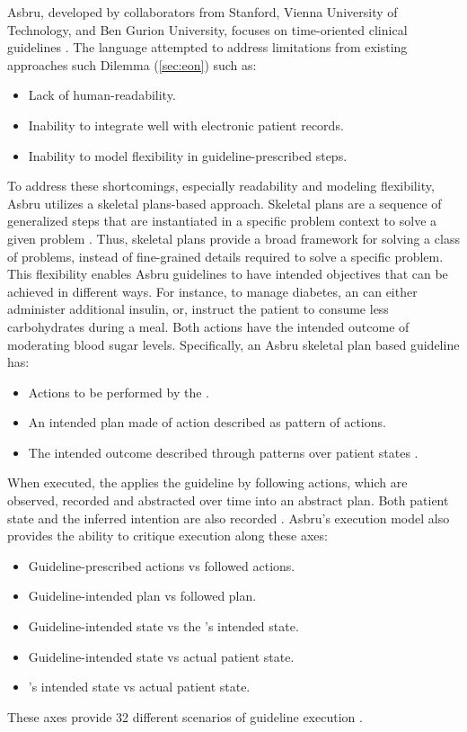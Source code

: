 Asbru, developed by collaborators from Stanford, Vienna
University of Technology, and Ben Gurion University, focuses on
time-oriented clinical guidelines \cite{ClerqAIM03}.
The language attempted to address limitations from existing approaches
such Dilemma (\autoref{sec:eon})
such as:
\begin{itemize}
  \item Lack of human-readability.
  \item Inability to integrate well with electronic patient records.
  \item Inability to model flexibility in guideline-prescribed steps.
\end{itemize}

To address these shortcomings, especially readability and modeling
flexibility, Asbru utilizes a skeletal plans-based approach.
Skeletal plans are a sequence of generalized steps that are instantiated
in a specific problem context to solve a given problem \cite{FriedlandJAR85}.
Thus, skeletal plans provide a broad framework for solving a class of problems,
instead of fine-grained details required to solve a specific problem.
This flexibility enables Asbru guidelines to have intended objectives that
can be achieved in different ways. For instance, to manage diabetes,
an \HCP{} can either administer additional insulin, or, instruct
the patient to consume less carbohydrates during a meal. Both actions
have the intended outcome of moderating blood sugar levels.
Specifically, an Asbru skeletal plan based guideline has:
\begin{itemize}
  \item Actions to be performed by the \HCP{}.
  \item An intended plan made of action described as pattern of actions.
  \item The intended outcome described through patterns over patient states \cite{ShaharAIM98}.
\end{itemize}

When executed, the \HCP{} applies the guideline by following actions,
which are observed, recorded and abstracted over time into an abstract plan.
Both patient state and the inferred intention are also recorded
\cite{ShaharAIM98}. Asbru's execution model also provides the ability
to critique execution along these axes:
\begin{itemize}
  \item Guideline-prescribed actions vs \HCP{} followed actions.
  \item Guideline-intended plan vs \HCP{} followed plan.
  \item Guideline-intended state vs the \HCP{}'s intended state.
  \item Guideline-intended state vs actual patient state.
  \item \HCP{}'s intended state vs actual patient state.
\end{itemize}
These axes provide 32 different scenarios of guideline execution
\cite{ShaharAIM98}.

